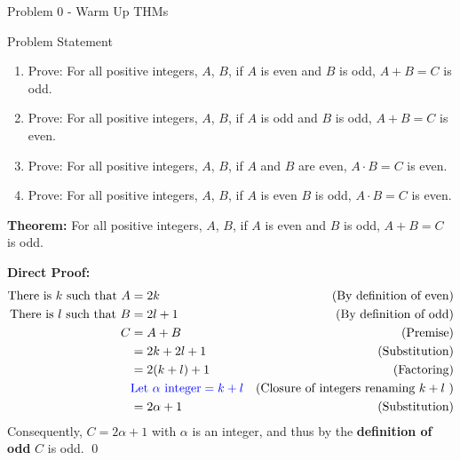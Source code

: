 \begin{problem}{Problem 0 - Warm Up THMs}
    \begin{statement}{Problem Statement}
        \begin{enumerate}[label=(\alph*)]
            \item Prove: For all positive integers, $A$, $B$, if $A$ is even and $B$ is odd, $A + B = C$ is odd.
            \item Prove: For all positive integers, $A$, $B$, if $A$ is odd and $B$ is odd, $A + B = C$ is even.
            \item Prove: For all positive integers, $A$, $B$, if $A$ and $B$ are even, $A \cdot B = C$ is even.
            \item Prove: For all positive integers, $A$, $B$, if $A$ is even $B$ is odd, $A \cdot B = C$ is even.
        \end{enumerate}
    \end{statement}

    \begin{Highlight}
        \textbf{Theorem:} For all positive integers, $A$, $B$, if $A$ is even and $B$ is odd, $A + B = C$ is odd. \vspace*{1em}

        \textbf{Direct Proof:} \newline
        \begin{align*}
            \text{There is $k$ such that } A & = 2k & \text{(By definition of even)} \\
            \text{There is $l$ such that } B & = 2l + 1 & \text{(By definition of odd)} \\
            C & = A + B & \text{(Premise)} \\
            & = 2k + 2l + 1 & \text{(Substitution)} \\
            & = 2(k + l) + 1 & \text{(Factoring)} \\
            & \textcolor{blue}{\text{Let } \alpha \text{ integer} = k + l} & \text{(Closure of integers renaming $k + l$ )} \\
            & = 2\alpha + 1 & \text{(Substitution)} \\
        \end{align*}
        Consequently, $C = 2\alpha + 1$ with $\alpha$ is an integer, and thus by the \textbf{definition of odd} $C$ is odd. \qed
    \end{Highlight}


\end{problem}
